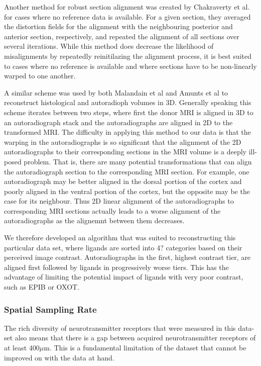 \documentclass[12pt]{article}
\begin{document}
Another method for robust section alignment was created by Chakraverty et al. \cite{Charkravarty2006} for cases where no reference data is available. For a given section, they averaged the distortion fields for the alignment with the neighbouring posterior and anterior section, respectively, and repeated the alignment of all sections over several iterations. While this method does decrease the likelihood of misalignments by repeatedly reinitilazing the alignment process, it is best suited to cases where no reference is available and where sections have to be non-linearly warped to one another. 

A similar scheme was used by both Malandain et al \cite{Malandain2004} and Amunts et al \cite{Amunts2013} to reconstruct histological and autoradioph volumes in 3D. Generally speaking this scheme iterates between two steps, where first the donor MRI is aligned in 3D to an autoradiograph stack and the autoradiographs are aligned in 2D to the transformed MRI. The difficulty in applying this method to our data is that the warping in the autoradiographs is so significant that the alignment of the 2D autoradiographs to their corresponding sections in the MRI volume is a deeply ill-posed problem. That is, there are many potential transformations that can align the autoradiograph section to the corresponding MRI section. For example, one autoradiograph may be better aligned in the dorsal portion of the cortex and poorly aligned in the ventral portion of the cortex, but the opposite may be the case for its neighbour. Thus 2D linear alignment of the autoradiographs to corresponding MRI sections actually leads to a worse alignment of the autoradiographs as the alignemnt between them decreases. 


We therefore developed an algorithm that was suited to reconstructing this particular data set, where ligands are sorted into 4? categories based on their perceived image contrast. Autoradiographs in the first, highest contrast tier, are aligned first followed by ligands in progressively worse tiers. This has the advantage of limiting the potential impact of ligands with very poor contrast, such as EPIB or OXOT. 

\subsubsection{Spatial Sampling Rate}
The rich diversity of neurotransmitter receptors that were measured in this data-set also means that there is a gap between acquired neurotransmitter receptors of at least 400$\mu$m.  This is a fundamental limitation of the dataset that cannot be improved on with the data at hand. 
\end{document}

